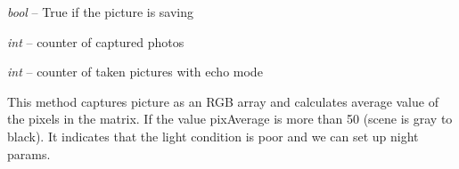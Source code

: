 \documentclass[letterpaper,10pt,english]{sphinxmanual}
\begin{document}
\begin{fulllineitems}
\begin{fulllineitems}
\end{fulllineitems}


\begin{fulllineitems}
\label{rpicameramon:rpicameramon.motion.CaptureHandler.working}
\emph{bool} -- True if the picture is saving

\end{fulllineitems}


\begin{fulllineitems}
\label{rpicameramon:rpicameramon.motion.CaptureHandler.i}
\emph{int} -- counter of captured photos

\end{fulllineitems}


\begin{fulllineitems}
\label{rpicameramon:rpicameramon.motion.CaptureHandler.echoCounter}
\emph{int} -- counter of taken pictures with echo mode

\end{fulllineitems}


\begin{fulllineitems}
\label{rpicameramon:rpicameramon.motion.CaptureHandler.motion_detected}
\end{fulllineitems}


\begin{fulllineitems}
\label{rpicameramon:rpicameramon.motion.CaptureHandler.scan_day}
This method captures picture as an RGB array and calculates
average value of the pixels in the matrix.
If the value pixAverage is more than 50 (scene is gray to black).
It indicates that the light condition is poor and we can set up night
params.

\end{fulllineitems}


\end{fulllineitems}
\end{document}
